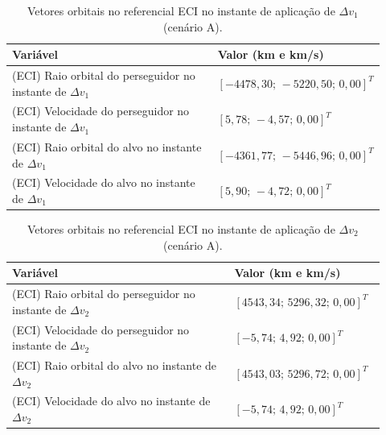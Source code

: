 \begin{table}[H]
\centering
\caption{Vetores orbitais no referencial ECI no instante de aplicação de $\Delta v_1$ (cenário A).}
\label{tab_cap4_eciA_dv1}
\begingroup
\small
\setlength{\tabcolsep}{4pt}
\renewcommand{\arraystretch}{1.15}
\begin{tabular}{|p{0.58\linewidth}|p{0.34\linewidth}|}
\hline
Variável & Valor (km e km/s)\\
\hline
(ECI) Raio orbital do perseguidor no instante de $\Delta v_1$ &
$\left[-4478,30;\,-5220,50;\,0,00\right]^T$\\
\hline
(ECI) Velocidade do perseguidor no instante de $\Delta v_1$ &
$\left[5,78;\,-4,57;\,0,00\right]^T$\\
\hline
(ECI) Raio orbital do alvo no instante de $\Delta v_1$ &
$\left[-4361,77;\,-5446,96;\,0,00\right]^T$\\
\hline
(ECI) Velocidade do alvo no instante de $\Delta v_1$ &
$\left[5,90;\,-4,72;\,0,00\right]^T$\\
\hline
\end{tabular}
\endgroup
\end{table}

\begin{table}[H]
\centering
\caption{Vetores orbitais no referencial ECI no instante de aplicação de $\Delta v_2$ (cenário A).}
\label{tab_cap4_eciA_dv2}
\begingroup
\small
\setlength{\tabcolsep}{4pt}
\renewcommand{\arraystretch}{1.15}
\begin{tabular}{|p{0.58\linewidth}|p{0.34\linewidth}|}
\hline
Variável & Valor (km e km/s)\\
\hline
(ECI) Raio orbital do perseguidor no instante de $\Delta v_2$ &
$\left[4543,34;\,5296,32;\,0,00\right]^T$\\
\hline
(ECI) Velocidade do perseguidor no instante de $\Delta v_2$ &
$\left[-5,74;\,4,92;\,0,00\right]^T$\\
\hline
(ECI) Raio orbital do alvo no instante de $\Delta v_2$ &
$\left[4543,03;\,5296,72;\,0,00\right]^T$\\
\hline
(ECI) Velocidade do alvo no instante de $\Delta v_2$ &
$\left[-5,74;\,4,92;\,0,00\right]^T$\\
\hline
\end{tabular}
\endgroup
\end{table}

